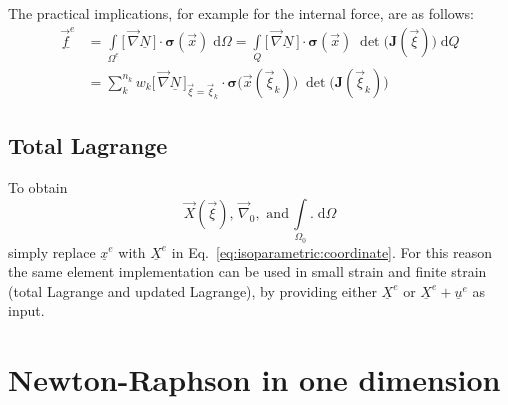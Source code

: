 \documentclass[times,namecite]{goose-article}
\begin{document}
The practical implications, for example for the internal force, are as follows:
\begin{align}
  \underline{\vec{f}^e}
  &=
  \int\limits_{\Omega^e}
    \big[\, \vec{\nabla} \underline{N} \,\big]
    \cdot
    \bm{\sigma}(\vec{x}) \;
  \mathrm{d}\Omega
  =
  \int\limits_{Q}
    \big[\, \vec{\nabla} \underline{N} \,\big]
    \cdot
    \bm{\sigma}(\vec{x}) \;
    \det \big( \bm{J}(\vec{\xi}) \big) \;
  \mathrm{d}Q
  \\
  &=
  \sum_{k}^{n_k}
  w_k
  \big[\, \vec{\nabla} \underline{N} \,\big]_{\vec{\xi} = \vec{\xi}_k}
  \cdot
  \bm{\sigma}\big(\vec{x}(\vec{\xi}_k)\big) \;
  \det \big( \bm{J}(\vec{\xi}_k) \big) \;
\end{align}

\subsection*{Total Lagrange}

To obtain
\begin{equation}
 \vec{X}(\vec{\xi}),\, \vec{\nabla}_0,\,\, \text{and}\, \int\limits_{\Omega_0} . \;\mathrm{d}\Omega
\end{equation}
simply replace $\underline{x}^e$ with $\underline{X}^e$ in Eq.~\eqref{eq:isoparametric:coordinate}. For this reason the same element implementation can be used in small strain and finite strain (total Lagrange and updated Lagrange), by providing either $\underline{X}^e$ or $\underline{X}^e + \underline{u}^e$ as input.


\section{Newton-Raphson in one dimension}
\label{sec:newton-raphson}
\end{document}
